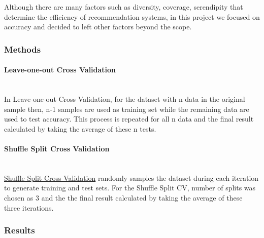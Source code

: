 	Although there are many factors such as diversity, coverage, serendipity that determine the efficiency of recommendation systems, in this project we focused on accuracy and decided to left other factors beyond the scope.
	\subsubsection{Methods}
	\paragraph{Leave-one-out Cross Validation} \mbox{} \\
	In Leave-one-out Cross Validation, for the dataset with n data in the original sample then, n-1 samples are used as training set while the remaining data are used to test accuracy. This process is repeated for all n data and the final result calculated by taking the average of these n tests.
	
	\paragraph{Shuffle Split Cross Validation} \mbox{} \\
	 \href{https://surprise.readthedocs.io/en/stable/model_selection.html#surprise.model_selection.split.ShuffleSplit}{Shuffle Split Cross Validation} randomly samples the dataset during each iteration to generate training and test sets. For the Shuffle Split CV, number of splits was chosen as 3 and the the final result calculated by taking the average of these three iterations.
	
	\subsubsection{Results}
